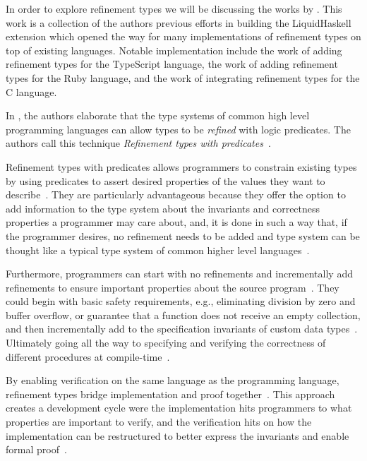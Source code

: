 \documentclass[
  oneside,
  english,
  coorientadorbanca,
  noabntexcite
]{ufsc-thesis-rn46-2019}
\begin{document}
In order to explore refinement types we will be discussing the works by \textcite{jhala2020tutorial}.
This work is a collection of the authors previous efforts in \textcite{vazou2014liquidhaskell} building the LiquidHaskell extension which opened the way for many implementations of refinement types on top of existing languages.
Notable implementation include the work of \textcite{vekris2016refinementtypescript} adding refinement types for the TypeScript language, the work of \textcite{vazou2018refinementruby} adding refinement types for the Ruby language, and the work of \textcite{sammler2021refinedc} integrating refinement types for the C language.

In \textcite{jhala2020tutorial}, the authors elaborate that the type systems of common high level programming languages can allow types to be \textit{refined} with logic predicates.
The authors call this technique \textit{Refinement types with predicates}~\cite{jhala2020tutorial}.

Refinement types with predicates allows programmers to constrain existing types by using predicates to assert desired properties of the values they want to describe~\cite{jhala2020tutorial}.
They are particularly advantageous because they offer the option to add information to the type system about the invariants and correctness properties a programmer may care about, and, it is done in such a way that, if the programmer desires, no refinement needs to be added and type system can be thought like a typical type system of common higher level languages~\cite{jhala2020tutorial}.

Furthermore, programmers can start with no refinements and incrementally add refinements to ensure important properties about the source program~\cite{jhala2020tutorial}.
They could begin with basic safety requirements, e.g., eliminating division by zero and buffer overflow, or guarantee that a function does not receive an empty collection, and then incrementally add to the specification invariants of custom data types~\cite{jhala2020tutorial}.
Ultimately going all the way to specifying and verifying the correctness of different procedures at compile-time~\cite{jhala2020tutorial}.

By enabling verification on the same language as the programming language, refinement types bridge implementation and proof together~\cite{jhala2020tutorial}.
This approach creates a development cycle were the implementation hits programmers to what properties are important to verify, and the verification hits on how the implementation can be restructured to better express the invariants and enable formal proof~\cite{jhala2020tutorial}.
\end{document}
